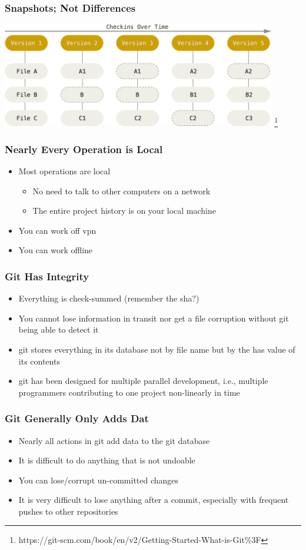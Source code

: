 \begin{frame}
  \frametitle{Snapshots; Not Differences}
  \centering
  \includegraphics[width=0.90\textwidth]{snapshots}
  \footnote{https://git-scm.com/book/en/v2/Getting-Started-What-is-Git\%3F}
\end{frame}

\begin{frame}
  \frametitle{Nearly Every Operation is Local}
  \begin{itemize}
    \item Most operations are local
      \begin{itemize}
        \item No need to talk to other computers on a network
        \item The entire project history is on your local machine
      \end{itemize}
    \item You can work off vpn
    \item You can work offline
  \end{itemize}
\end{frame}

\begin{frame}
  \frametitle{Git Has Integrity}
  \begin{itemize}
    \item Everything is check-summed (remember the sha?)
    \item You cannot lose information in transit nor get a file corruption
      without git being able to detect it
    \item git stores everything in its database not by file name but by the has
      value of its contents
    \item git has been designed for multiple parallel development, i.e.,
      multiple programmers contributing to one project non-linearly in time
  \end{itemize}
\end{frame}

\begin{frame}
  \frametitle{Git Generally Only Adds Dat}
  \begin{itemize}
    \item Nearly all actions in git add data to the git database
    \item It is difficult to do anything that is not undoable
    \item You can lose/corrupt un-committed changes
    \item It is very difficult to lose anything after a commit, especially with
      frequent pushes to other repositories
  \end{itemize}
\end{frame}

